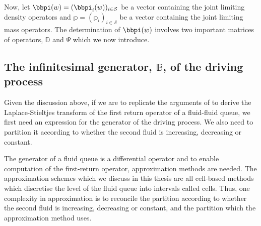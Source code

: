 Now, let ${{\bbpi}}(w) = ( \bbpi_i(w))_{i \in \mathcal{S}}$ be a vector containing the joint limiting density operators and ${\mathbb{p}} = ( {\mathbb p}_i)_{i \in \mathcal{S}}$ be a vector containing the joint limiting mass operators. The determination of ${{\bbpi}}(w)$ involves two important matrices of operators, $ {\mathbb D}$ and $ {\mathbb \Psi}$ which we now introduce. %

\subsection{The infinitesimal generator, \(\mathbb B\), of the driving process}\label{subsec: operatorsoffq}
Given the discussion above, if we are to replicate the arguments of \cite{bean2005} to derive the Laplace-Stieltjes transform of the first return operator of a fluid-fluid queue, we first need an expression for the generator of the driving process. We also need to partition it according to whether the second fluid is increasing, decreasing or constant. 

The generator of a fluid queue is a differential operator and to enable computation of the first-return operator, approximation methods are needed. The approximation schemes which we discuss in this thesis are all cell-based methods which discretise the level of the fluid queue into intervals called cells. Thus, one complexity in approximation is to reconcile the partition according to whether the second fluid is increasing, decreasing or constant, and the partition which the approximation method uses. %

\label{subsec:B_operators}

